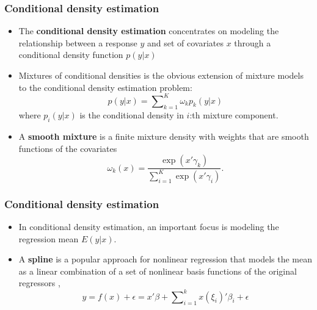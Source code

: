 \documentclass[10pt]{beamer}
\begin{document}
\begin{frame}
  \frametitle{Conditional density estimation}

  \begin{itemize}
  \item The \textbf{conditional density estimation} concentrates on modeling the
    relationship between a response $y$ and set of covariates $x$ through a
    conditional density function $p(y|x)$

  \item Mixtures of conditional densities is the obvious extension of mixture
    models to the conditional density estimation problem:
    \[
    p(y|x)=\sum\nolimits _{k=1}^{K}\omega_{k}p_{k}(y|x)
    \]
    where $p_{i}(y|x)$ is the conditional density in $i$:th mixture component.

  \item A \textbf{smooth mixture} is a finite mixture density with weights that
    are smooth functions of the covariates
    \[
    \omega_{k}(x)=\frac{\exp(x'\gamma_{k})}{\sum_{i=1}^{K}\exp(x'\gamma_{i})}.
    \]
  \end{itemize}

\end{frame}



\begin{frame}
  \frametitle{Conditional density estimation}

  \begin{itemize}
  \item In conditional density estimation, an important focus is modeling
    the regression mean $E(y|x)$.

  \item A \textbf{spline} is a popular approach for nonlinear regression that
    models the mean as a linear combination of a set of nonlinear basis
    functions of the original regressors \citep{holmes2003generalized},
    \[
    y=f(x)+\epsilon=x'\beta+\sum\nolimits _{i=1}^{k}x(\xi_{i})'\beta_{i}+\epsilon
    \]

  \end{itemize}
\end{frame}
\end{document}
